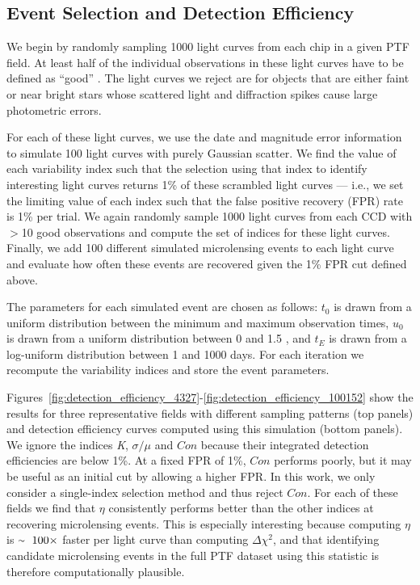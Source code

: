 \documentclass{emulateapj}
\newcommand{\apwsim}{\raisebox{0.2ex}{\scriptsize$\sim$\normalsize}}
\begin{document}
\subsection{Event Selection and Detection Efficiency} \label{sec:detection_eff}
We begin by randomly sampling 1000 light curves from each chip in a given PTF field. At least half of the individual observations in these light curves have to be defined as ``good'' \citep[see description of processing pipeline in][]{nick2009}. The light curves we reject are for objects that are either faint or near bright stars whose scattered light and diffraction spikes cause large photometric errors. 

For each of these light curves, we use the date and magnitude error information to simulate 100 light curves with purely Gaussian scatter. We find the value of each variability index such that the selection using that index to identify interesting light curves returns 1\% of these scrambled light curves --- i.e., we set the limiting value of each index such that the false positive recovery (FPR) rate is 1\% per trial. We again randomly sample 1000 light curves from each CCD with $>$10 good observations and compute the set of indices for these light curves. Finally, we add 100 different simulated microlensing events to each light curve and evaluate how often these events are recovered given the 1\% FPR cut defined above. 

The parameters for each simulated event are chosen as follows: $t_0$ is drawn from a uniform distribution between the minimum and maximum observation times, $u_0$ is drawn from a uniform distribution between 0 and \apwsim1.5 \citep[the impact parameter that causes a maximum deviation larger than \apwsim$5\sigma$ for an $R\sim17.5$ mag source; e.g.,][]{macho_detection_efficiency}, and $t_E$ is drawn from a log-uniform distribution between 1 and 1000 days. For each iteration we recompute the variability indices and store the event parameters. 

Figures~\ref{fig:detection_efficiency_4327}-\ref{fig:detection_efficiency_100152} show the results for three representative fields with different sampling patterns (top panels) and detection efficiency curves computed using this simulation (bottom panels). We ignore the indices \textit{K}, $\sigma/\mu$ and $Con$ because their integrated detection efficiencies are below 1\%. At a fixed FPR of 1\%, $Con$ performs poorly, but it may be useful as an initial cut by allowing a higher FPR. In this work, we only consider a single-index selection method and thus reject $Con$. For each of these fields we find that $\eta$ consistently performs better than the other indices at recovering microlensing events. This is especially interesting because computing $\eta$ is $\apwsim100\times$ faster per light curve than computing $\Delta\chi^2$, and that identifying candidate microlensing events in the full PTF dataset using this statistic is therefore computationally plausible.
	
\end{document}
